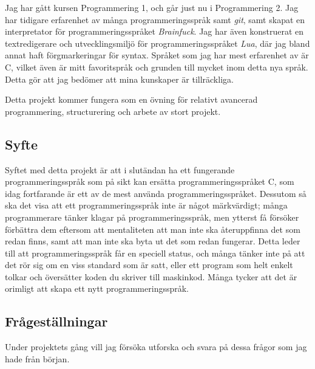 \documentclass{theme}
\begin{document}
Jag har gått kursen Programmering 1, och går just nu i Programmering 2. Jag har
tidigare erfarenhet av många programmeringsspråk samt \textit{git}, samt skapat 
en interpretator för programmeringsspråket \textit{Brainfuck}. Jag har även 
konstruerat en textredigerare och utvecklingsmiljö för programmeringsspråket
\textit{Lua}, där jag bland annat haft förgmarkeringar för syntax. Språket som
jag har mest erfarenhet av är C, vilket även är mitt favoritspråk och grunden
till mycket inom detta nya språk. Detta gör att jag bedömer att mina kunskaper
är tillräckliga.

Detta projekt kommer fungera som en övning för relativt avancerad programmering,
structurering och arbete av stort projekt. 

\subsection{Syfte}

Syftet med detta projekt är att i slutändan ha ett fungerande 
programmeringsspråk som på sikt kan ersätta programmeringsspråket C, som idag 
fortfarande är ett av de mest använda programmeringsspråket. Dessutom så ska det
visa att ett programmeringsspråk inte är något märkvärdigt; många programmerare
tänker klagar på programmeringsspråk, men ytterst få försöker förbättra dem 
eftersom att mentaliteten att man inte ska återuppfinna det som redan finns, 
samt att man inte ska byta ut det som redan fungerar. Detta leder till att 
programmeringsspråk får en speciell status, och många tänker inte på att det 
rör sig om en viss standard som är satt, eller ett program som helt enkelt 
tolkar och översätter koden du skriver till maskinkod. Många tycker att det är 
orimligt att skapa ett nytt programmeringsspråk.

\subsection{Frågeställningar}

Under projektets gång vill jag försöka utforska och svara på dessa frågor som
jag hade från början. 
\end{document}
